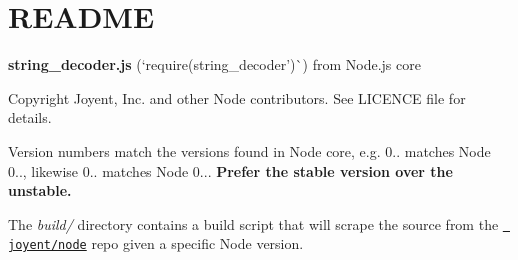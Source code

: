\chapter{README}
\hypertarget{md__c_1_2_users_2_s_t_r_i_d_e_r_2source_2repos_2_internal_a_p_i_2_internal_a_p_i_2wwwroot_2lib_220a06d00fd448d2383355e965f1be9c5}{}\label{md__c_1_2_users_2_s_t_r_i_d_e_r_2source_2repos_2_internal_a_p_i_2_internal_a_p_i_2wwwroot_2lib_220a06d00fd448d2383355e965f1be9c5}
{\bfseries{string\+\_\+decoder.\+js}} (`require(\textquotesingle{}string\+\_\+decoder')\`{}) from Node.\+js core

Copyright Joyent, Inc. and other Node contributors. See LICENCE file for details.

Version numbers match the versions found in Node core, e.\+g. 0.. matches Node 0.., likewise 0.. matches Node 0... {\bfseries{Prefer the stable version over the unstable.}}

The {\itshape build/} directory contains a build script that will scrape the source from the \href{https://github.com/joyent/node}{\texttt{ joyent/node}} repo given a specific Node version. 